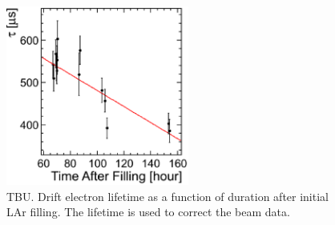 \begin{figure}[htbp]
 \begin{center}
  \includegraphics[width=60mm]{fig/tauHistory.eps}
 \end{center}
 \caption{TBU. Drift electron lifetime as a function of duration after initial LAr filling. The lifetime is used to correct the beam data.}
 \label{fig:CosmicPurity}
\end{figure}

